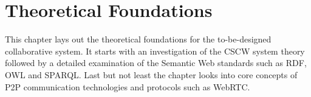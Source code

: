 
\chapter{Theoretical Foundations} %
\label{cha:theoretical_foundations}

This chapter lays out the theoretical foundations for the to-be-designed collaborative system. It starts with an investigation of the \gls{CSCW} system theory followed by a detailed examination of the Semantic Web standards such as \gls{RDF}, \gls{OWL} and \gls{SPARQL}. Last but not least the chapter looks into core concepts of \gls{P2P} communication technologies and protocols such as \gls{WebRTC}.







